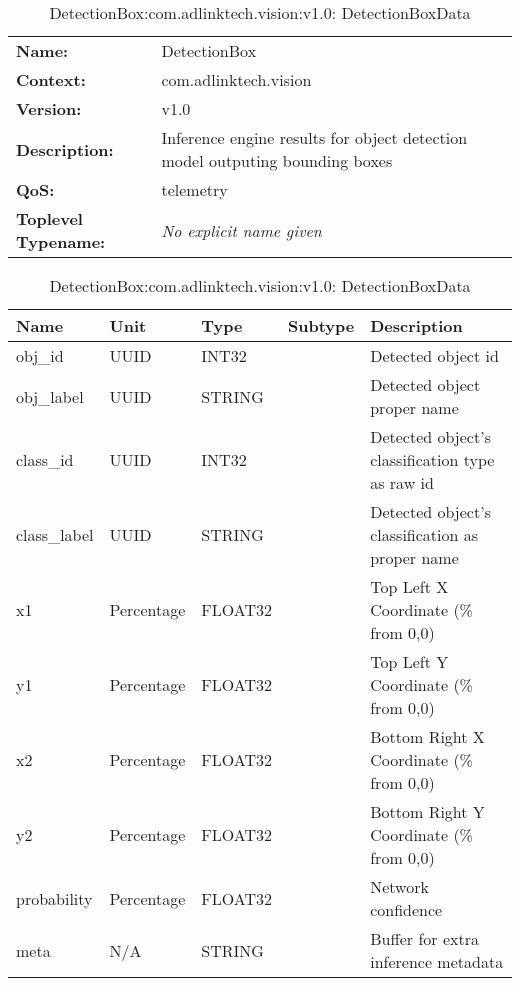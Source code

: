 \begin{table}[H]
\begin{tabularx}{\textwidth}{l X} 
       \textbf{Name:} & DetectionBox \\ 
	   \textbf{Context:} & com.adlinktech.vision \\ 
	   \textbf{Version:} & v1.0 \\ 
	   \textbf{Description:} & Inference engine results for object detection model outputing bounding boxes \\ 
	   \textbf{QoS:} & telemetry \\
	   \textbf{Toplevel Typename:} & \textit{No explicit name given} \\ 
\end{tabularx}
\caption{DetectionBox:com.adlinktech.vision:v1.0}\label{DetectionBoxTagGroup.json:table:DetectionBox}
\bigskip
\begin{tabularx}{\textwidth}{l l l l X} 
	 \textbf{Name} & \textbf{Unit} & \textbf{Type} & \textbf{Subtype} & \textbf{Description} \\
	 \midrule
   obj\_id & UUID & INT32 &  & Detected object id \\
   obj\_label & UUID & STRING &  & Detected object proper name \\
   class\_id & UUID & INT32 &  & Detected object's classification type as raw id \\
   class\_label & UUID & STRING &  & Detected object's classification as proper name \\
   x1 & Percentage & FLOAT32 &  & Top Left X Coordinate (\% from 0,0) \\
   y1 & Percentage & FLOAT32 &  & Top Left Y Coordinate (\% from 0,0) \\
   x2 & Percentage & FLOAT32 &  & Bottom Right X Coordinate (\% from 0,0) \\
   y2 & Percentage & FLOAT32 &  & Bottom Right Y Coordinate (\% from 0,0) \\
   probability & Percentage & FLOAT32 &  & Network confidence \\
   meta & N/A & STRING &  & Buffer for extra inference metadata \\
\end{tabularx}
\caption{DetectionBox:com.adlinktech.vision:v1.0: DetectionBoxData}\label{DetectionBoxTagGroup.json:table:DetectionBox-DetectionBoxData}


\end{table}
